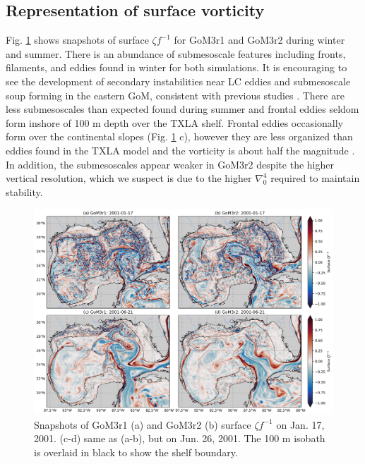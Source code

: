 \subsection{Representation of surface vorticity}
Fig. \ref{fig:gom3_rvort_planview} shows snapshots of surface $\zeta f^{-1}$ for GoM3r1 and GoM3r2 during winter and summer. There is an abundance of submesoscale features including fronts, filaments, and eddies found in winter for both simulations. It is encouraging to see the development of secondary instabilities near LC eddies and submesoscale soup forming in the eastern GoM, consistent with previous studies \citep{Barkan_2017, bracco2019mesoscale, liu2021submesoscale}. There are less submesoscales than expected found during summer and frontal eddies seldom form inshore of 100 m depth over the TXLA shelf. Frontal eddies occasionally form over the continental slopes (Fig. \ref{fig:gom3_rvort_planview} c), however they are less organized than eddies found in the TXLA model and the vorticity is about half the magnitude \citep[compare to Fig. 2 of ][]{Schlichting23}. In addition, the submesoscales appear weaker in GoM3r2 despite the higher vertical resolution, which we suspect is due to the higher $\nabla_0^4$ required to maintain stability. 

\begin{figure}[t]
\centerline{\includegraphics[width=\textwidth]{figures/scgsr/GoM3_rvort_comp2.jpg}}
    \caption{Snapshots of GoM3r1 (a) and GoM3r2 (b) surface $\zeta f^{-1}$ on Jan. 17, 2001. (c-d) same as (a-b), but on Jun. 26, 2001. The 100 m isobath is overlaid in black to show the shelf boundary.}
    \label{fig:gom3_rvort_planview}
\end{figure}

